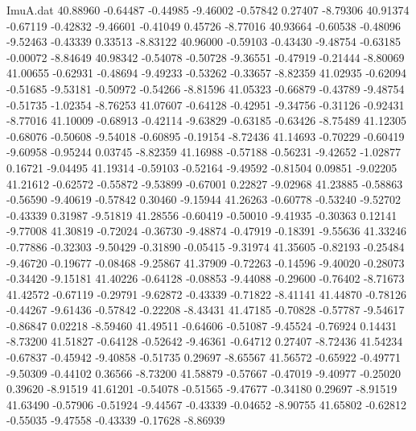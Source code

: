 \begin{filecontents}{ImuA.dat}
  40.88960   -0.64487   -0.44985   -9.46002   -0.57842    0.27407   -8.79306
  40.91374   -0.67119   -0.42832   -9.46601   -0.41049    0.45726   -8.77016
  40.93664   -0.60538   -0.48096   -9.52463   -0.43339    0.33513   -8.83122
  40.96000   -0.59103   -0.43430   -9.48754   -0.63185   -0.00072   -8.84649
  40.98342   -0.54078   -0.50728   -9.36551   -0.47919   -0.21444   -8.80069
  41.00655   -0.62931   -0.48694   -9.49233   -0.53262   -0.33657   -8.82359
  41.02935   -0.62094   -0.51685   -9.53181   -0.50972   -0.54266   -8.81596
  41.05323   -0.66879   -0.43789   -9.48754   -0.51735   -1.02354   -8.76253
  41.07607   -0.64128   -0.42951   -9.34756   -0.31126   -0.92431   -8.77016
  41.10009   -0.68913   -0.42114   -9.63829   -0.63185   -0.63426   -8.75489
  41.12305   -0.68076   -0.50608   -9.54018   -0.60895   -0.19154   -8.72436
  41.14693   -0.70229   -0.60419   -9.60958   -0.95244    0.03745   -8.82359
  41.16988   -0.57188   -0.56231   -9.42652   -1.02877    0.16721   -9.04495
  41.19314   -0.59103   -0.52164   -9.49592   -0.81504    0.09851   -9.02205
  41.21612   -0.62572   -0.55872   -9.53899   -0.67001    0.22827   -9.02968
  41.23885   -0.58863   -0.56590   -9.40619   -0.57842    0.30460   -9.15944
  41.26263   -0.60778   -0.53240   -9.52702   -0.43339    0.31987   -9.51819
  41.28556   -0.60419   -0.50010   -9.41935   -0.30363    0.12141   -9.77008
  41.30819   -0.72024   -0.36730   -9.48874   -0.47919   -0.18391   -9.55636
  41.33246   -0.77886   -0.32303   -9.50429   -0.31890   -0.05415   -9.31974
  41.35605   -0.82193   -0.25484   -9.46720   -0.19677   -0.08468   -9.25867
  41.37909   -0.72263   -0.14596   -9.40020   -0.28073   -0.34420   -9.15181
  41.40226   -0.64128   -0.08853   -9.44088   -0.29600   -0.76402   -8.71673
  41.42572   -0.67119   -0.29791   -9.62872   -0.43339   -0.71822   -8.41141
  41.44870   -0.78126   -0.44267   -9.61436   -0.57842   -0.22208   -8.43431
  41.47185   -0.70828   -0.57787   -9.54617   -0.86847    0.02218   -8.59460
  41.49511   -0.64606   -0.51087   -9.45524   -0.76924    0.14431   -8.73200
  41.51827   -0.64128   -0.52642   -9.46361   -0.64712    0.27407   -8.72436
  41.54234   -0.67837   -0.45942   -9.40858   -0.51735    0.29697   -8.65567
  41.56572   -0.65922   -0.49771   -9.50309   -0.44102    0.36566   -8.73200
  41.58879   -0.57667   -0.47019   -9.40977   -0.25020    0.39620   -8.91519
  41.61201   -0.54078   -0.51565   -9.47677   -0.34180    0.29697   -8.91519
  41.63490   -0.57906   -0.51924   -9.44567   -0.43339   -0.04652   -8.90755
  41.65802   -0.62812   -0.55035   -9.47558   -0.43339   -0.17628   -8.86939

\end{filecontents}
